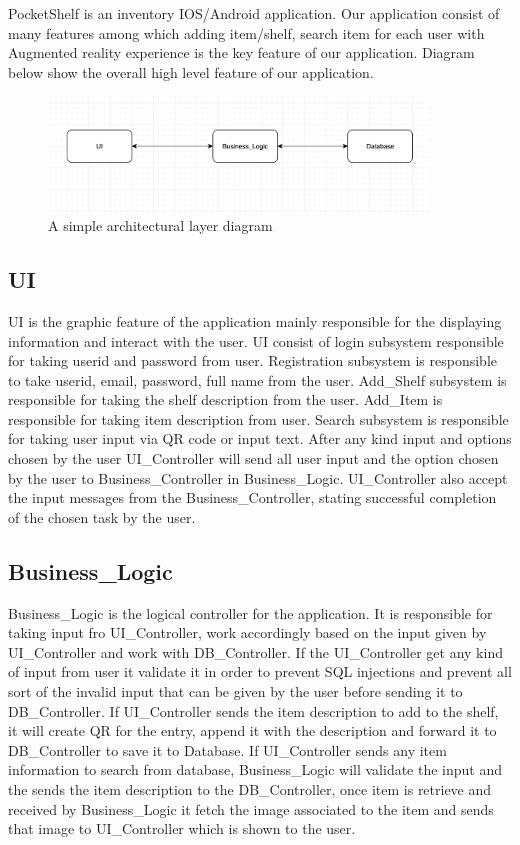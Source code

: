 PocketShelf is an inventory IOS/Android application. Our application consist of many features among which adding item/shelf, search item for each user with Augmented reality experience is the key feature of our application. Diagram below show the overall high level feature of our application.


\begin{figure}[h!]
	\centering
 	\includegraphics[width=0.90\textwidth]{images/overview}
 \caption{A simple architectural layer diagram}
\end{figure}

\subsection{UI}
UI is the graphic feature of the application mainly responsible for the displaying information and interact with the user. UI consist of login subsystem responsible for taking userid and password from user. Registration subsystem is responsible to take userid, email, password, full name from the user. Add\_Shelf subsystem is responsible for taking the shelf description from the user. Add\_Item is responsible for taking item description from user. Search subsystem is responsible for taking user input via QR code or input text. After any kind input and options chosen by the user UI\_Controller will send all user input and the option chosen by the user to Business\_Controller in Business\_Logic. UI\_Controller also accept the input messages from the Business\_Controller, stating successful completion of the chosen task by the user.

\subsection{Business\_Logic}
Business\_Logic is the logical controller for the application. It is responsible for taking input fro UI\_Controller, work accordingly based on the input given by UI\_Controller and work with DB\_Controller. If the UI\_Controller get any kind of input from user it validate it in order to prevent SQL injections and prevent all sort of the invalid input that can be given by the user before sending it to DB\_Controller. If UI\_Controller sends the item description to add to the shelf, it will create QR for the entry, append it with the description and forward it to DB\_Controller to save it to Database. If UI\_Controller sends any item information to search from database, Business\_Logic will validate the input and the sends the item description to the DB\_Controller, once item is retrieve and received by Business\_Logic it fetch the image associated to the item and sends that image to UI\_Controller which is shown to the user.


